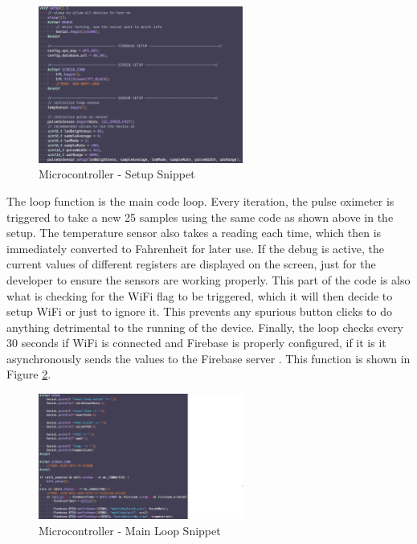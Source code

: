\documentclass[12pt]{article}
\begin{document}
    \begin{figure}[ht]
        \centering
        \includegraphics[width=0.6\textwidth]{uc_setup}
        \caption{Microcontroller - Setup Snippet}
        \label{uc_setup}
    \end{figure} 

    The loop function is the main code loop. Every iteration, the pulse oximeter is triggered to take a new 25 samples using the same code as shown above in the setup. The temperature sensor also takes a reading each time, which then is immediately converted to Fahrenheit for later use. If the debug is active, the current values of different registers are displayed on the screen, just for the developer to ensure the sensors are working properly. This part of the code is also what is checking for the WiFi flag to be triggered, which it will then decide to setup WiFi or just to ignore it. This prevents any spurious button clicks to do anything detrimental to the running of the device. Finally, the loop checks every 30 seconds if WiFi is connected and Firebase is properly configured, if it is it asynchronously sends the values to the Firebase server \cite{firebase_client_lib}. This function is shown in Figure \ref{uc_main}.

    \begin{figure}[ht]
        \centering
        \includegraphics[width=0.6\textwidth]{uc_main}
        \caption{Microcontroller - Main Loop Snippet}
        \label{uc_main}
    \end{figure} 
\end{document}
